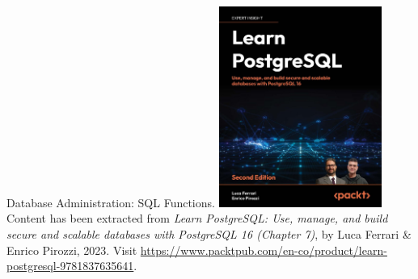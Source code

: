\documentclass{beamer}
\begin{document}
\begin{frame}{Database Administration: SQL Functions.}
    \centering
    \includegraphics[width=0.4\textwidth]{figures/book_cover}\\
    \vspace{2mm}
    {
        \scriptsize
        Content has been extracted from \textit{Learn PostgreSQL: Use, manage, and build secure and scalable databases with PostgreSQL 16 (Chapter 7)}, by Luca Ferrari \& Enrico Pirozzi, 2023.  Visit \url{https://www.packtpub.com/en-co/product/learn-postgresql-9781837635641}.
    }
\end{frame}
\end{document}
